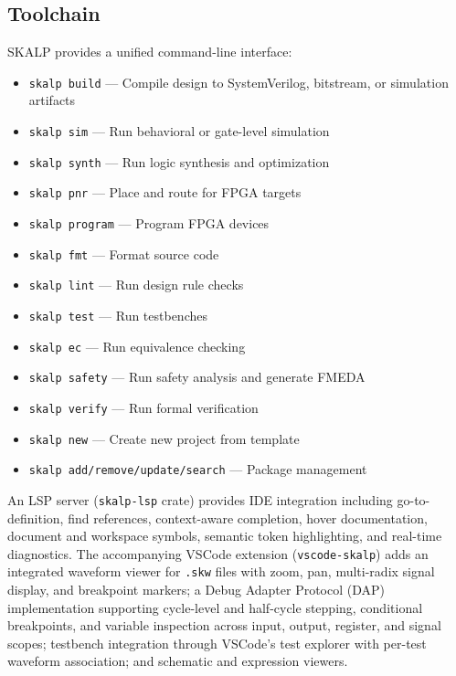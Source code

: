 \documentclass[conference]{IEEEtran}
\begin{document}
\subsection{Toolchain}

SKALP provides a unified command-line interface:

\begin{itemize}
  \item \texttt{skalp build} --- Compile design to SystemVerilog, bitstream, or simulation artifacts
  \item \texttt{skalp sim} --- Run behavioral or gate-level simulation
  \item \texttt{skalp synth} --- Run logic synthesis and optimization
  \item \texttt{skalp pnr} --- Place and route for FPGA targets
  \item \texttt{skalp program} --- Program FPGA devices
  \item \texttt{skalp fmt} --- Format source code
  \item \texttt{skalp lint} --- Run design rule checks
  \item \texttt{skalp test} --- Run testbenches
  \item \texttt{skalp ec} --- Run equivalence checking
  \item \texttt{skalp safety} --- Run safety analysis and generate FMEDA
  \item \texttt{skalp verify} --- Run formal verification
  \item \texttt{skalp new} --- Create new project from template
  \item \texttt{skalp add/remove/update/search} --- Package management
\end{itemize}

An LSP server (\texttt{skalp-lsp} crate) provides IDE integration including go-to-definition, find references, context-aware completion, hover documentation, document and workspace symbols, semantic token highlighting, and real-time diagnostics. The accompanying VSCode extension (\texttt{vscode-skalp}) adds an integrated waveform viewer for \texttt{.skw} files with zoom, pan, multi-radix signal display, and breakpoint markers; a Debug Adapter Protocol (DAP) implementation supporting cycle-level and half-cycle stepping, conditional breakpoints, and variable inspection across input, output, register, and signal scopes; testbench integration through VSCode's test explorer with per-test waveform association; and schematic and expression viewers.
\end{document}
